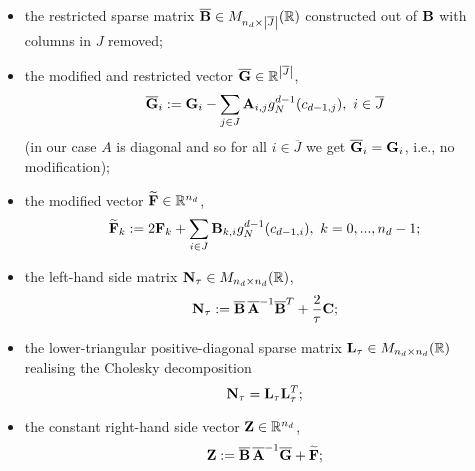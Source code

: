 \begin{algorithm}
\begin{enumerate}
\begin{itemize}
          the restricted diagonal matrix
          $\overline{\bf A} \in
            M_{\abs{\overline{J}} \times \abs{\overline{J}}}(\R)$
          constructed out of ${\bf A}$ with rows and columns in $J$ removed;
        \item
          the restricted sparse matrix
          $\overline{\bf B} \in M_{n_d \times \left\lvert\overline{J}\right\rvert}(\mathbb{R})$
          constructed out of ${\bf B}$ with columns in $J$ removed;
        \item
          the modified and restricted vector
          $\overline{\bf G} \in \mathbb{R}^{\left\lvert\overline{J}\right\rvert}$,
          \begin{equation}
            \overline{\bf G}_i :=
            {\bf G}_i
            - \sum_{j \in J} {\bf A}_{i, j} g_N^{d - 1}(c_{d - 1, j}),\
            i \in \overline{J}
          \end{equation}
          (in our case  $A$ is diagonal and so for all $i \in \overline{J}$
          we get $\overline{\bf G}_i = {\bf G}_i$, i.e., no modification);
        \item
          the modified vector $\widetilde{\bf F} \in \mathbb{R}^{n_d}$,
          \begin{equation}
            \widetilde{\bf F}_k
            := 2 {\bf F}_k
              + \sum_{i \in J} {\bf B}_{k, i} g_N^{d - 1}(c_{d - 1, i}),\
            k = 0, ..., n_d - 1;
          \end{equation}
        \item
          the left-hand side matrix ${\bf N}_\tau \in M_{n_d \times n_d}(\mathbb{R})$,
          \begin{equation}
            {\bf N}_\tau
            := \overline{\bf B}\, \overline{\bf A}^{-1} \overline{\bf B}^T
              + \frac{2}{\tau} {\bf C};
          \end{equation}
        \item
          the lower-triangular positive-diagonal sparse matrix
          ${\bf L}_\tau \in M_{n_d \times n_d}(\mathbb{R})$
          realising the Cholesky decomposition
          \begin{equation}
            {\bf N}_\tau = {\bf L}_\tau {\bf L}^T_\tau;
          \end{equation}
        \item
          the constant right-hand side vector ${\bf Z} \in \mathbb{R}^{n_d}$,
          \begin{equation}
            {\bf Z}
            := \overline{\bf B}\, \overline{\bf A}^{-1} \overline{\bf G}
              + \widetilde{\bf F};
          \end{equation}

\end{itemize}
\end{enumerate}
\end{algorithm}
